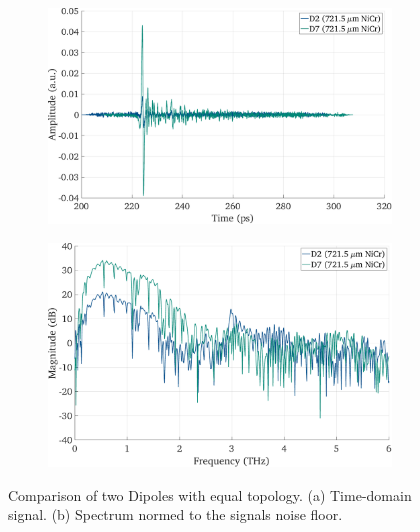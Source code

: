 \begin{figure}[!tbp]
    \centering
    \begin{subfigure}[b]{0.485\textwidth}
        \centering
        \includegraphics[width=\textwidth]{figures/Results/D2_D7/D2_D7_time.pdf}
        \caption{}
    \end{subfigure}
    \hfill
    \begin{subfigure}[b]{0.485\textwidth}
        \centering
        \includegraphics[width=\textwidth]{figures/Results/D2_D7/D2_D7_spectrum_nn.pdf}
        \caption{}
    \end{subfigure}
    \caption{Comparison of two Dipoles with equal topology. (a) Time-domain signal. (b) Spectrum normed to the signals noise floor.}
\end{figure}